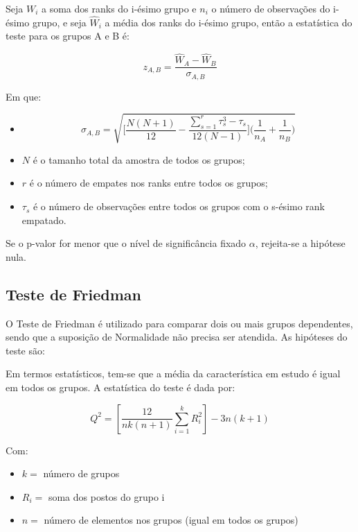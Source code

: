 \documentclass[
]{estat/estat}
\providecommand{\tightlist}{%
  \setlength{\itemsep}{0pt}\setlength{\parskip}{0pt}}\usepackage{longtable,booktabs,array}
\begin{document}

Seja \(W_i\) a soma dos ranks do i-ésimo grupo e \(n_i\) o número de
observações do i-ésimo grupo, e seja \(\hat{W}_i\) a média dos ranks do
i-ésimo grupo, então a estatística do teste para os grupos A e B é:

\[z_{A,B} = \frac{\hat{W}_A - \hat{W}_B}{\sigma_{A,B}} \]

Em que:

\begin{itemize}
\tightlist
\item
  \[\sigma_{A,B} = \sqrt{\Bigg[\frac{N(N+1)}{12}-\frac{\sum^r_{s=1}\tau_s^3-\tau_s}{12(N-1)}\Bigg]\Bigg(\frac{1}{n_A}+\frac{1}{n_B}\Bigg)}\]
\item
  \(N\) é o tamanho total da amostra de todos os grupos;
\item
  \(r\) é o número de empates nos ranks entre todos os grupos;
\item
  \(\tau_s\) é o número de observações entre todos os grupos com o
  s-ésimo rank empatado.
\end{itemize}

Se o p-valor for menor que o nível de significância fixado \(\alpha\),
rejeita-se a hipótese nula.

\subsection{Teste de Friedman}\label{teste-de-friedman}

O Teste de Friedman é utilizado para comparar dois ou mais grupos
dependentes, sendo que a suposição de Normalidade não precisa ser
atendida. As hipóteses do teste são:


Em termos estatísticos, tem-se que a média da característica em estudo é
igual em todos os grupos. A estatística do teste é dada por:

\[Q^2=\left[\frac{12}{nk(n+1)} \sum_{i=1}^k R_i^2\right] - 3n(k+1)\]

Com:

\begin{itemize}
\tightlist
\item
  \(k=\) número de grupos
\item
  \(R_i=\) soma dos postos do grupo i
\item
  \(n=\) número de elementos nos grupos (igual em todos os grupos)
\end{itemize}
\end{document}
